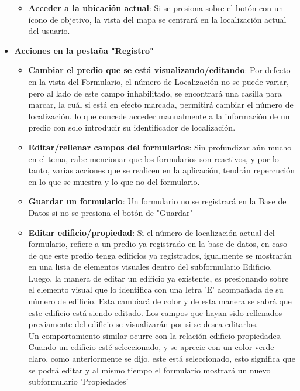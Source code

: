 \begin{itemize}
\begin{itemize}
              \item \textbf{Acceder a la ubicación actual}: Si se presiona sobre el botón con un ícono de objetivo, la vista del mapa se centrará en
                    la localización actual del usuario.
          \end{itemize}
    \item \textbf{Acciones en la pestaña "Registro"}
          \begin{itemize}
              \item \textbf{Cambiar el predio que se está visualizando/editando}: Por defecto en la vista del Formulario, el número de Localización no se puede variar,
                    pero al lado de este campo inhabilitado, se encontrará una casilla para marcar, la cuál si está en efecto marcada, permitirá cambiar el número de
                    localización, lo que concede acceder manualmente a la información de un predio con solo introducir su identificador de localización.
              \item \textbf{Editar/rellenar campos del formularios}: Sin profundizar aún mucho en el tema, cabe mencionar que los formularios son reactivos, y por lo tanto,
                    varias acciones que se realicen en la aplicación, tendrán repercución en lo que se muestra y lo que no del formulario.
              \item \textbf{Guardar un formulario}: Un formulario no se registrará en la Base de Datos si no se presiona el botón de "Guardar"
              \item \textbf{Editar edificio/propiedad}: Si el número de localización actual del formulario, refiere a un predio ya registrado en la base de datos, en caso de
                    que este predio tenga edificios ya registrados, igualmente se mostrarán en una lista de elementos visuales dentro del subformulario Edificio. Luego, la manera
                    de editar un edificio ya existente, es presionando sobre el elemento visual que lo identifica con una letra 'E' acompañada de su número de edificio. Esta cambiará
                    de color y de esta manera se sabrá que este edificio está siendo editado. Los campos que hayan sido rellenados previamente del edificio se visualizarán por si se
                    desea editarlos. \\
                    Un comportamiento similar ocurre con la relación edificio-propiedades. Cuando un edificio esté seleccionado, y se aprecie con un color verde claro, como
                    anteriormente se dijo, este está seleccionado, esto significa que se podrá editar y al mismo tiempo el formulario mostrará un nuevo subformulario 'Propiedades'

\end{itemize}
\end{itemize}
